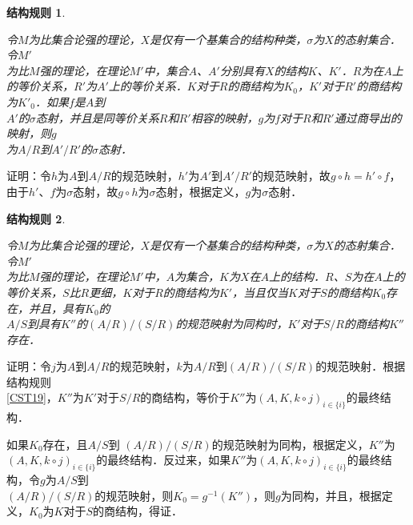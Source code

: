 \documentclass[12pt, a4paper, oneside]{book}
\newtheorem{CST}{结构规则}
\begin{document}
			\begin{CST}\label{CST20}
				\hfill\par
				令$M$为比集合论强的理论，$X$是仅有一个基集合的结构种类，$\sigma$为$X$的态射集合．令$M'$\\为比$M$强的理论，在理论$M'$中，集合$A$、$A'$分别具有$X$的结构$K$、$K'$．$R$为在$A$上的等价关系，$R'$为$A'$上的等价关系．$K$对于$R$的商结构为$K_0$，$K'$对于$R'$的商结构为${K'}_0$．如果$f$是$A$到\\$A'$的$\sigma$态射，并且是同等价关系$R$和$R'$相容的映射，$g$为$f$对于$R$和$R'$通过商导出的映射，则$g$\\为$A/R$到$A'/R'$的$\sigma$态射．
			\end{CST}
			证明：令$h$为$A$到$A/R$的规范映射，$h'$为$A'$到$A'/R'$的规范映射，故$g\circ h=h'\circ f$，由于$h'$、$f$为$\sigma$态射，故$g\circ h$为$\sigma$态射，根据定义，$g$为$\sigma$态射．
			
			\begin{CST}\label{CST21}
				\hfill\par
				令$M$为比集合论强的理论，$X$是仅有一个基集合的结构种类，$\sigma$为$X$的态射集合．令$M'$\\为比$M$强的理论，在理论$M'$中，$A$为集合，$K$为$X$在$A$上的结构．$R$、$S$为在$A$上的等价关系，$S$比$R$更细，$K$对于$R$的商结构为$K'$，当且仅当$K$对于$S$的商结构$K_0$存在，并且，具有$K_0$的\\$A/S$到具有$K''$的$(A/R)/(S/R)$的规范映射为同构时，$K'$对于$S/R$的商结构$K''$存在．
			\end{CST}
			证明：令$j$为$A$到$A/R$的规范映射，$k$为$A/R$到$(A/R)/(S/R)$的规范映射．根据结构规则\\\ref{CST19}，$K''$为$K'$对于$S/R$的商结构，等价于$K''$为$(A, K, k\circ j)_{i\in \{i\}}$的最终结构．
			\par
			如果$K_0$存在，且$A/S$到 $(A/R)/(S/R)$的规范映射为同构，根据定义，$K''$为$(A, K, k\circ j)_{i\in \{i\}}$的最终结构．反过来，如果$K''$为$(A, K, k\circ j)_{i\in \{i\}}$的最终结构，令$g$为$A/S$到\\$(A/R)/(S/R)$的规范映射，则$K_0=g^{-1}(K'')$，则$g$为同构，并且，根据定义，$K_0$为$K$对于$S$的商结构，得证．
\end{document}
